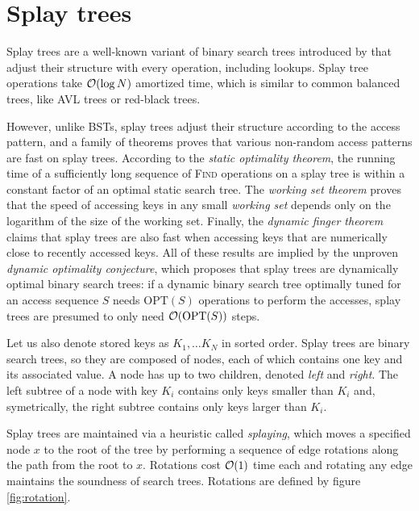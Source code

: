 \chapter{Splay trees}
\label{chapter:splay}
Splay trees are a well-known variant of binary search trees introduced
by \cite{splay} that adjust their structure with every operation, including
lookups. Splay tree operations take $\mathcal{O}(\log N)$ amortized time, which is
similar to common balanced trees, like AVL trees or red-black trees.

However, unlike BSTs, splay trees adjust their structure
according to the access pattern, and a family of theorems proves that
various non-random access patterns are fast on splay trees.
According to the \emph{static optimality theorem}, the running time
of a sufficiently long sequence of \textsc{Find} operations on a splay tree
is within a constant factor of an optimal static search tree.
The \emph{working set theorem} proves that the speed of accessing keys in
any small \emph{working set} depends only on the logarithm of the size
of the working set.
Finally, the \emph{dynamic finger theorem} claims that splay trees are also
fast when accessing keys that are numerically close to recently accessed keys.
All of these results are implied by the unproven \emph{dynamic optimality
conjecture}, which proposes that splay trees are dynamically optimal binary
search trees: if a dynamic binary search tree optimally tuned for an access
sequence $S$ needs $\mathrm{OPT}(S)$ operations to perform the accesses, splay
trees are presumed to only need $\mathcal{O}(\mathrm{OPT}(S))$ steps.

Let us also denote stored keys as $K_1,\ldots K_N$ in sorted order.
Splay trees are binary search trees, so they are composed of nodes, each of
which contains one key and its associated value. A node has up to two children,
denoted \emph{left} and \emph{right}.
The left subtree of a node with key $K_i$ contains only keys smaller than $K_i$
and, symetrically, the right subtree contains only keys larger than $K_i$.

Splay trees are maintained via a heuristic called \emph{splaying}, which
moves a specified node $x$ to the root of the tree by performing a sequence
of edge rotations along the path from the root to $x$.
Rotations cost $\mathcal{O}(1)$ time each and rotating any edge maintains
the soundness of search trees. Rotations are defined by figure
\ref{fig:rotation}.

\newcommand{\hunk}[2]{ node [splay_hunk] (hunk#1-#2) {#1} }

